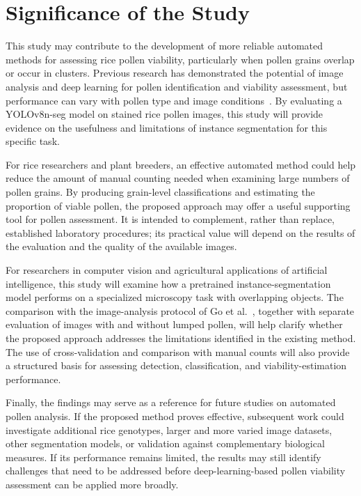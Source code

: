 \newpage
\section{Significance of the Study}
\label{ch:significance}

This study may contribute to the development of more reliable automated methods for assessing rice pollen viability, particularly when pollen grains overlap or occur in clusters. Previous research has demonstrated the potential of image analysis and deep learning for pollen identification and viability assessment, but performance can vary with pollen type and image conditions~\cite{go2019,zhang2023,tan2022,li2026pvdt}. By evaluating a YOLOv8n-seg model on stained rice pollen images, this study will provide evidence on the usefulness and limitations of instance segmentation for this specific task.

For rice researchers and plant breeders, an effective automated method could help reduce the amount of manual counting needed when examining large numbers of pollen grains. By producing grain-level classifications and estimating the proportion of viable pollen, the proposed approach may offer a useful supporting tool for pollen assessment. It is intended to complement, rather than replace, established laboratory procedures; its practical value will depend on the results of the evaluation and the quality of the available images.

For researchers in computer vision and agricultural applications of artificial intelligence, this study will examine how a pretrained instance-segmentation model performs on a specialized microscopy task with overlapping objects. The comparison with the image-analysis protocol of Go et al.~\cite{go2019}, together with separate evaluation of images with and without lumped pollen, will help clarify whether the proposed approach addresses the limitations identified in the existing method. The use of cross-validation and comparison with manual counts will also provide a structured basis for assessing detection, classification, and viability-estimation performance.

Finally, the findings may serve as a reference for future studies on automated pollen analysis. If the proposed method proves effective, subsequent work could investigate additional rice genotypes, larger and more varied image datasets, other segmentation models, or validation against complementary biological measures. If its performance remains limited, the results may still identify challenges that need to be addressed before deep-learning-based pollen viability assessment can be applied more broadly.
